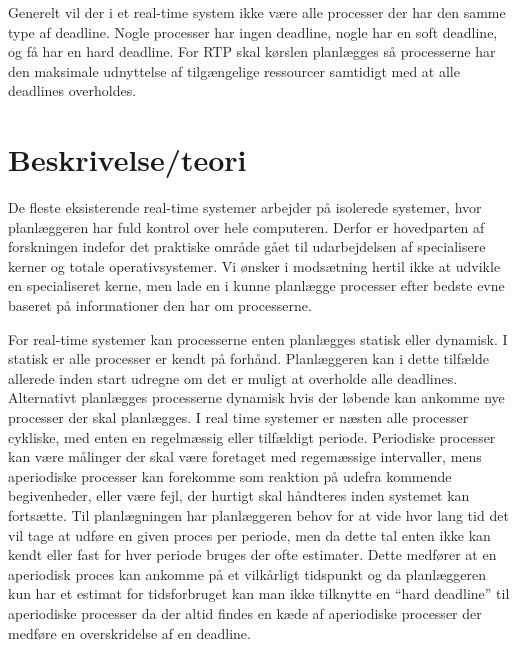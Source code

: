 Generelt vil der i et real-time system ikke være alle processer der har den samme type af deadline. Nogle processer har ingen deadline, nogle har en soft deadline, og få har en hard deadline. For RTP skal kørslen planlægges så processerne har den maksimale udnyttelse af tilgængelige ressourcer samtidigt med at alle deadlines overholdes.

\section{Beskrivelse/teori}
De fleste eksisterende real-time systemer arbejder på isolerede systemer, hvor planlæggeren har fuld kontrol over hele computeren. Derfor er hovedparten af forskningen indefor det praktiske område gået til udarbejdelsen af specialisere kerner og totale operativsystemer\cite{damm1989real, jones1979staros, levi1989maruti,ramamritham14scheduling}. Vi ønsker i modsætning hertil ikke at udvikle en specialiseret kerne, men lade \sched en i \pycsp kunne planlægge processer efter bedste evne baseret på informationer den har om processerne.

For real-time systemer kan processerne enten planlægges statisk eller dynamisk\cite{cheng1987scheduling}. I statisk er alle processer er kendt på forhånd. Planlæggeren kan i dette tilfælde allerede inden start udregne om det er muligt at overholde alle deadlines. Alternativt planlægges processerne dynamisk hvis der  løbende kan ankomme nye  processer der skal planlægges. I real time systemer er næsten alle processer cykliske, med enten en regelmæssig eller tilfældigt periode. Periodiske processer kan være målinger der skal være foretaget med regemæssige intervaller, mens aperiodiske processer kan forekomme som reaktion på udefra kommende begivenheder, eller være fejl, der hurtigt skal håndteres inden systemet kan fortsætte.
Til planlægningen har planlæggeren behov for at vide hvor lang tid det vil tage at udføre en given proces per periode, men da dette tal enten ikke kan kendt eller fast for hver periode bruges der ofte estimater. Dette medfører at en aperiodisk proces kan ankomme på et vilkårligt tidspunkt og da planlæggeren kun har et estimat for tidsforbruget kan man  ikke tilknytte en ``hard deadline'' til aperiodiske processer da der altid findes en kæde af aperiodiske processer der medføre en overskridelse af en deadline. 

